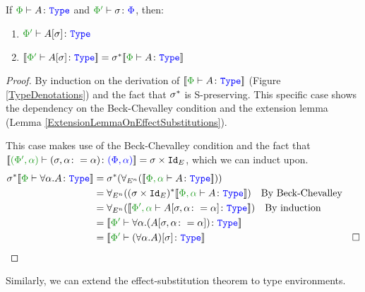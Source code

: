 \begin{framed}
    \begin{theorem}\label{EffectSubstitutionOnTypes}
       If $\wellformedtype{\P}{A}$ and $\typerelation{\P'}{\si}{\P}$, then:
       \begin{enumerate}[label=\roman*.]
           \item $\wellformedtype{\P'}{A\ssi}$
           \item $\deno{\wellformedtype{\P'}{A\ssi}} = \si\star\deno{\wellformedtype{\P}{A}}$
       \end{enumerate}
    \end{theorem}
    
    \begin{proof}
       By induction on the derivation of $\deno{\wellformedtype{\P}{A}}$ (Figure \ref{TypeDenotations}) and the fact that $\sigma^*$ is S-preserving. This specific case shows the dependency on the Beck-Chevalley condition and the extension lemma (Lemma \ref{ExtensionLemmaOnEffectSubstitutions}).
            
        \case{\tquant}
        This case makes use of the Beck-Chevalley condition and the fact that $\deno{\typerelation{(\P', \a)}{(\si, \a\setto\a)}{(\P, \a)}} = \si\times\Id{E}$, which we can induct upon.
            \begin{align*}
                \si\star\deno{\typerelation{\P}{\all{\a}A}{\type}} & = \si\star(\allEn(\deno{\typerelation{\P,\a}{A}{\type}}))\\
                & = \allEn((\si\times\Id{E})\star\deno{\typerelation{\P,\a}{A}{\type}})\qt{By Beck-Chevalley}\\
                & = \allEn(\deno{\typerelation{\P',\a}{A\sub{\si, \a\setto\a}}{\type}})\qt{By induction}\\
                & = \deno{\typerelation{\P'}{\all{\a}{(A\sub{\si, \a\setto\a})}}{\type}}\\
                & = \deno{\typerelation{\P'}{(\all{\a}{A})\ssi}{\type}} & \square
            \end{align*}
    \end{proof}
\end{framed}

Similarly, we can extend the effect-substitution theorem to type environments.

